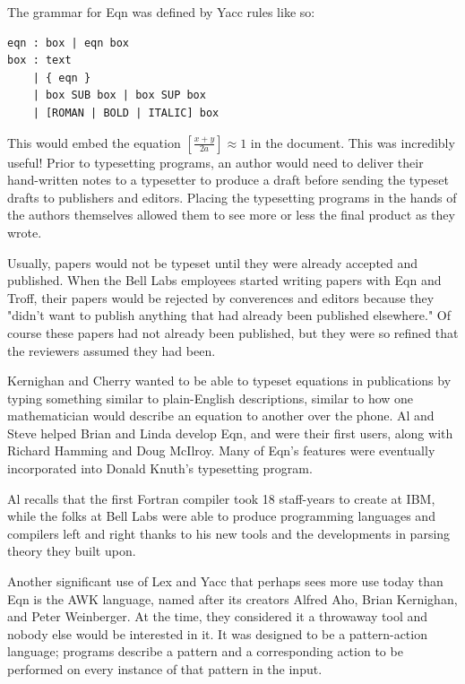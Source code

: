 The grammar for Eqn was defined by Yacc rules like so:

\begin{lstlisting}[frame=single]
eqn : box | eqn box
box : text
    | { eqn }
    | box SUB box | box SUP box
    | [ROMAN | BOLD | ITALIC] box
\end{lstlisting}

This would embed the equation $ [ \frac{x + y}{2a} ] \approx 1 $ in the document.
This was incredibly useful! Prior to typesetting programs, an author would need to deliver their
hand-written notes to a typesetter to produce a draft before sending the typeset drafts to
publishers and editors. Placing the typesetting programs in the hands of the authors themselves
allowed them to see more or less the final product as they wrote.

Usually, papers would not be typeset until they were already accepted and published.
When the Bell Labs employees started writing papers with Eqn and Troff, their papers
would be rejected by converences and editors because they "didn't want to publish anything that
had already been published elsewhere."
Of course these papers had not already been published, but they were so refined
that the reviewers assumed they had been.

Kernighan and Cherry wanted to be able to typeset equations in publications by typing
something similar to plain-English descriptions, similar to how one mathematician would
describe an equation to another over the phone.
Al and Steve helped Brian and Linda develop Eqn, and were their first users,
along with Richard Hamming and Doug McIlroy.
Many of Eqn's features were eventually incorporated into Donald Knuth's \tex typesetting program.

Al recalls that the first Fortran compiler took 18 staff-years to create at IBM,
while the folks at Bell Labs were able to produce programming languages and compilers left and right
thanks to his new tools and the developments in parsing theory they built upon.

Another significant use of Lex and Yacc that perhaps sees more use today than Eqn is the AWK language,
named after its creators Alfred Aho, Brian Kernighan, and Peter Weinberger.
At the time, they considered it a throwaway tool and nobody else would be interested in it.
It was designed to be a pattern-action language; programs describe a pattern and a corresponding
action to be performed on every instance of that pattern in the input.


